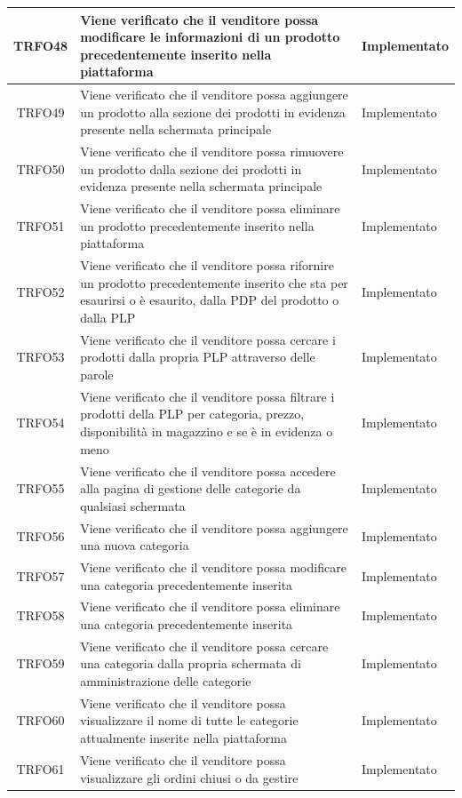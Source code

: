 \begin{longtable}{|c| C{10cm} |C{3cm}|}
    	TRFO48 & Viene verificato che il venditore possa modificare le informazioni di un prodotto precedentemente inserito nella piattaforma & Implementato\\ \hline
    	TRFO49 & Viene verificato che il venditore possa aggiungere un prodotto alla sezione dei prodotti in evidenza presente nella schermata principale & Implementato\\ \hline
    	TRFO50 & Viene verificato che il venditore possa rimuovere un prodotto dalla sezione dei prodotti in evidenza  presente nella schermata principale & Implementato\\ \hline
    	TRFO51 & Viene verificato che il venditore possa eliminare un prodotto precedentemente inserito nella piattaforma & Implementato\\ \hline
    	TRFO52 & Viene verificato che il venditore possa rifornire un prodotto precedentemente inserito che sta per esaurirsi o è esaurito, dalla PDP del prodotto o dalla PLP & Implementato\\ \hline
   	TRFO53 & Viene verificato che il venditore possa cercare i prodotti dalla propria PLP attraverso delle parole & Implementato\\ \hline
    	TRFO54 & Viene verificato che il venditore possa filtrare i prodotti della PLP per categoria, prezzo, disponibilità in magazzino e se è in evidenza o meno & Implementato\\ \hline
	TRFO55 & Viene verificato che il venditore possa accedere alla pagina di gestione delle categorie da qualsiasi schermata & Implementato\\ \hline
    	TRFO56 & Viene verificato che il venditore possa aggiungere una nuova categoria & Implementato\\ \hline
    	TRFO57 & Viene verificato che il venditore possa modificare una categoria precedentemente inserita & Implementato\\ \hline
   	TRFO58 & Viene verificato che il venditore possa eliminare una categoria precedentemente inserita & Implementato\\ \hline
    	TRFO59 & Viene verificato che il venditore possa cercare una categoria dalla propria schermata di amministrazione delle categorie & Implementato\\ \hline
	TRFO60 & Viene verificato che il venditore possa visualizzare il nome di tutte le categorie attualmente inserite nella piattaforma & Implementato\\ \hline
	TRFO61 & Viene verificato che il venditore possa visualizzare gli ordini chiusi o da gestire & Implementato\\ \hline

\end{longtable}
